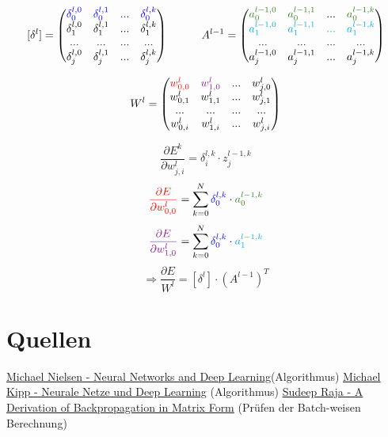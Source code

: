 \documentclass{article}
\begin{document}
 \[ [\delta^l] =
 \begin{pmatrix}
    \textcolor{blue}{\delta_0^{l,0}} & \textcolor{blue}{\delta_0^{l,1}} & \textcolor{blue}{...} & \textcolor{blue}{\delta_0^{l,k}} \\
    \delta_1^{l,0} & \delta_1^{l,1} & ... & \delta_1^{l,k} \\
    ... & ... & ... & ... \\
    \delta_j^{l,0} & \delta_j^{l,1} & ... & \delta_j^{l,k} \\
 \end{pmatrix} 
 \kern 30pt
 A^{l-1} = 
 \begin{pmatrix}
    \textcolor{OliveGreen}{a_0^{l-1,0}} & \textcolor{OliveGreen}{a_0^{l-1,1}} & ... & \textcolor{OliveGreen}{a_0^{l-1,k}} \\
    \textcolor{Cyan}{a_1^{l-1,0}} & \textcolor{Cyan}{a_1^{l-1,1}} & \textcolor{Cyan}{...} & \textcolor{Cyan}{a_1^{l-1,k}} \\
    ... & ... & ... & ... \\
    a_j^{l-1,0} & a_j^{l-1,1} & ... & a_j^{l-1,k} \\
 \end{pmatrix} \]

\[ W^l = \begin{pmatrix}
    \textcolor{red}{w_{0,0}^l} & \textcolor{Plum}{w_{1,0}^l} & ... & w_{j,0}^l \\
    w_{0,1}^l & w_{1,1}^l & ... & w_{j,1}^l \\
    ... & ... & ... & ... \\
    w_{0,i}^l & w_{1,i}^l & ... & w_{j,i}^l
\end{pmatrix} \]



 \[ \frac{\partial E^k}{\partial w_{j,i}^{l}} = \delta_i^{l,k} \cdot z_j^{l-1,k} \]
 \[ \textcolor{red}{\frac{\partial E}{\partial w_{0,0}^l}} = 
 \sum_{k = 0}^{N} \textcolor{blue}{\delta_0^{l,k}} \cdot \textcolor{OliveGreen}{a_0^{l-1,k}} \]
  \[ \textcolor{Plum}{\frac{\partial E}{\partial w_{1,0}^l}} = 
 \sum_{k = 0}^{N} \textcolor{blue}{\delta_0^{l,k}} \cdot \textcolor{Cyan}{a_1^{l-1,k}} \]
\[ \Rightarrow \frac{\partial E}{W^l} = [\delta^l] \cdot (A^{l-1})^T \]


\section{Quellen}
\href{http://neuralnetworksanddeeplearning.com}{Michael Nielsen - Neural Networks and Deep Learning}(Algorithmus) \linebreak
\href{https://michaelkipp.de/deeplearning}{Michael Kipp - Neurale Netze und Deep Learning} (Algorithmus) \linebreak
\href{https://sudeepraja.github.io/Neural/}{Sudeep Raja - A Derivation of Backpropagation in Matrix Form} (Prüfen der Batch-weisen Berechnung)
\end{document}
